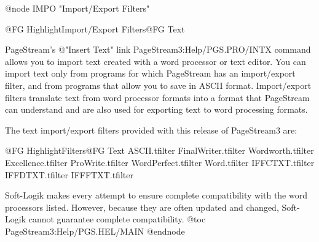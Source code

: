 @node IMPO "Import/Export Filters"

@{FG Highlight}Import/Export Filters@{FG Text}

PageStream's @{"Insert Text" link PageStream3:Help/PGS.PRO/INTX} command allows you to import text created with a
word processor or text editor. You can import text only from programs for
which PageStream has an import/export filter, and from programs that
allow you to save in ASCII format. Import/export filters translate text
from word processor formats into a format that PageStream can understand
and are also used for exporting text to word processing formats.

The text import/export filters provided with this release of PageStream3
are:

@{FG Highlight}Filters@{FG Text}
ASCII.tfilter
FinalWriter.tfilter
Wordworth.tfilter
Excellence.tfilter
ProWrite.tfilter
WordPerfect.tfilter
Word.tfilter
IFFCTXT.tfilter
IFFDTXT.tfilter
IFFFTXT.tfilter

Soft-Logik makes every attempt to ensure complete compatibility with the
word processors listed. However, because they are often updated and
changed, Soft-Logik cannot guarantee complete compatibility.
@toc PageStream3:Help/PGS.HEL/MAIN
@endnode

